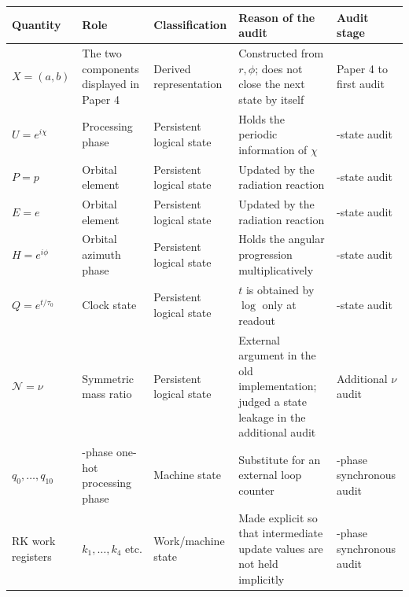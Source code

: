 \documentclass[
  a4paper,
]{article}
\newcounter{none} %
\begin{document}
{\def\LTcaptype{none} %
\begin{longtable}[]{@{}
  >{\raggedright\arraybackslash}p{}
  >{\raggedright\arraybackslash}p{}
  >{\raggedright\arraybackslash}p{}
  >{\raggedright\arraybackslash}p{}
  >{\raggedright\arraybackslash}p{}@{}}
\toprule\noalign{}
\begin{minipage}[b]{\linewidth}\raggedright
Quantity
\end{minipage} & \begin{minipage}[b]{\linewidth}\raggedright
Role
\end{minipage} & \begin{minipage}[b]{\linewidth}\raggedright
Classification
\end{minipage} & \begin{minipage}[b]{\linewidth}\raggedright
Reason of the audit
\end{minipage} & \begin{minipage}[b]{\linewidth}\raggedright
Audit stage
\end{minipage} \\
\midrule\noalign{}
\endhead
\bottomrule\noalign{}
\endlastfoot
\(X=(a,b)\) & The two components displayed in Paper 4 & Derived
representation & Constructed from \(r,\phi\); does not close the next
state by itself & Paper 4 to first audit \\
\(U=e^{i\chi}\) & Processing phase & Persistent logical state & Holds
the periodic information of \(\chi\) & 5-state audit \\
\(P=p\) & Orbital element & Persistent logical state & Updated by the
radiation reaction & 5-state audit \\
\(E=e\) & Orbital element & Persistent logical state & Updated by the
radiation reaction & 5-state audit \\
\(H=e^{i\phi}\) & Orbital azimuth phase & Persistent logical state &
Holds the angular progression multiplicatively & 5-state audit \\
\(Q=e^{t/\tau_0}\) & Clock state & Persistent logical state & \(t\) is
obtained by \(\log\) only at readout & 5-state audit \\
\(\mathcal N=\nu\) & Symmetric mass ratio & Persistent logical state &
External argument in the old implementation; judged a state leakage in
the additional audit & Additional \(\nu\) audit \\
\(q_0,\ldots,q_{10}\) & 11-phase one-hot processing phase & Machine
state & Substitute for an external loop counter & 11-phase synchronous
audit \\
RK work registers & \(k_1,\ldots,k_4\) etc. & Work/machine state & Made
explicit so that intermediate update values are not held implicitly &
11-phase synchronous audit \\
\end{longtable}
}
\end{document}
